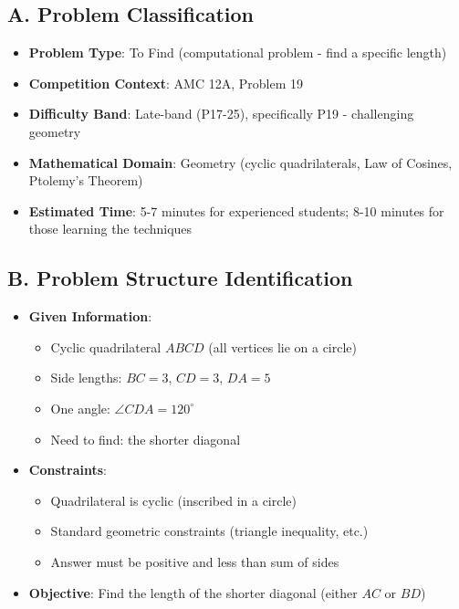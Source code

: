 \documentclass[11pt]{article}
\begin{document}
\begin{problemconfigbox}
\subsection*{A. Problem Classification}
\begin{itemize}[leftmargin=*]
    \item \textbf{Problem Type}: To Find (computational problem - find a specific length)
    \item \textbf{Competition Context}: AMC 12A, Problem 19
    \item \textbf{Difficulty Band}: Late-band (P17-25), specifically P19 - challenging geometry
    \item \textbf{Mathematical Domain}: Geometry (cyclic quadrilaterals, Law of Cosines, Ptolemy's Theorem)
    \item \textbf{Estimated Time}: 5-7 minutes for experienced students; 8-10 minutes for those learning the techniques
\end{itemize}

\subsection*{B. Problem Structure Identification}
\begin{itemize}[leftmargin=*]
    \item \textbf{Given Information}: 
    \begin{itemize}
        \item Cyclic quadrilateral $ABCD$ (all vertices lie on a circle)
        \item Side lengths: $BC = 3$, $CD = 3$, $DA = 5$
        \item One angle: $\angle CDA = 120^\circ$
        \item Need to find: the shorter diagonal
    \end{itemize}
    
    \item \textbf{Constraints}: 
    \begin{itemize}
        \item Quadrilateral is cyclic (inscribed in a circle)
        \item Standard geometric constraints (triangle inequality, etc.)
        \item Answer must be positive and less than sum of sides
    \end{itemize}
    
    \item \textbf{Objective}: Find the length of the shorter diagonal (either $AC$ or $BD$)
    

\end{itemize}
\end{problemconfigbox}
\end{document}
